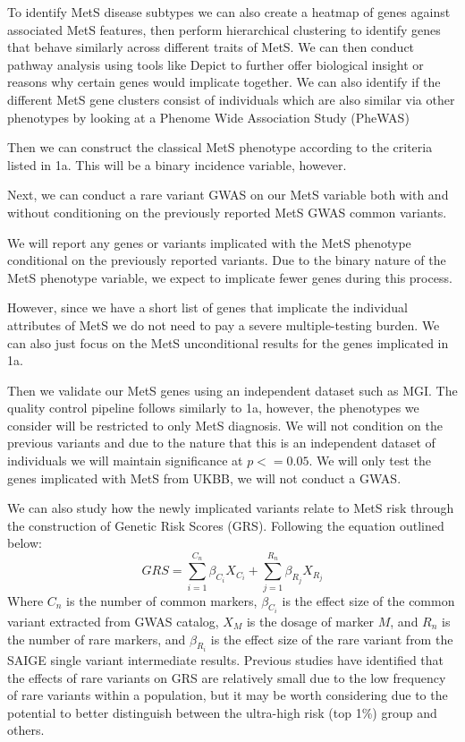 \documentclass[11pt]{article}
\begin{document}
To identify MetS disease subtypes we can also  create a heatmap of genes against associated MetS features, then perform hierarchical clustering to identify genes that behave similarly across different traits of MetS. We can then conduct pathway analysis using tools like Depict to further offer biological insight or reasons why certain genes would implicate together. We can also identify if the different MetS gene clusters consist of individuals which are also similar via other phenotypes by looking at a Phenome Wide Association Study (PheWAS)

Then we can construct the classical MetS phenotype according to the criteria listed in 1a. This will be a binary incidence variable, however. 

Next, we can conduct a rare variant GWAS on our MetS variable both with and without conditioning on the previously reported MetS GWAS common variants.

We will report any genes or variants implicated with the MetS phenotype conditional on the previously reported variants. Due to the binary nature of the MetS phenotype variable, we expect to implicate fewer genes during this process.

However, since we have a short list of genes that implicate the individual attributes of MetS we do not need to pay a severe multiple-testing burden. We can also just focus on the MetS unconditional results for the genes implicated in 1a.

Then we validate our MetS genes using an independent dataset such as MGI. The quality control pipeline follows similarly to 1a, however, the phenotypes we consider will be restricted to only MetS diagnosis. We will not condition on the previous variants and due to the nature that this is an independent dataset of individuals we will maintain significance at $p <= 0.05$. We will only test the genes implicated with MetS from UKBB, we will not conduct a GWAS.

We can also study how the newly implicated variants relate to MetS risk through the construction of Genetic Risk Scores (GRS). Following the equation outlined below:
$$GRS = \sum_{i=1}^{C_n} \beta_{C_i}X_{C_i} + \sum_{j=1}^{R_n} \beta_{R_j}X_{R_j}$$
Where $C_n$ is the number of common markers, $\beta_{C_i}$ is the effect size of the common variant extracted from GWAS catalog, $X_M$ is the dosage of marker $M$, and $R_n$ is the number of rare markers, and $\beta_{R_i}$ is the effect size of the rare variant from the SAIGE single variant intermediate results. Previous studies have identified that the effects of rare variants on GRS are relatively small due to the low frequency of rare variants within a population, but it may be worth considering due to the potential to better distinguish between the ultra-high risk (top 1\%) group and others. 
\end{document}

